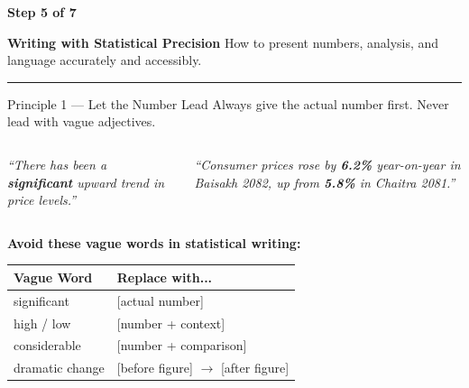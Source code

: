 \documentclass[xcolor={table,dvipsnames},aspectratio=169,11pt]{beamer}
\newcommand{\stepbadge}[1]{%
    \begin{tcolorbox}[colback=nsoGold,colframe=nsoGold,arc=8pt,auto outer arc,
        halign=center,valign=center,width=2.5cm,boxrule=0pt,top=2pt,bottom=2pt,left=2pt,right=2pt]
        \color{white}\tiny\bfseries #1
    \end{tcolorbox}%
}
\begin{document}
{
\begin{frame}[plain]
    \vspace{1.5cm}
    \stepbadge{Step 5 of 7}
    \vskip 0.4cm
    {\color{white}\LARGE\bfseries Writing with Statistical Precision}
    \vskip 0.4cm
    {\color{nsoLight}\large How to present numbers, analysis, and language accurately and accessibly.}
    \vskip 0.8cm
    \textcolor{nsoGold}{\rule{3cm}{3pt}}
\end{frame}
}

\begin{frame}{Principle 1 --- Let the Number Lead}
    Always give the actual number first. Never lead with vague adjectives.
    \vskip 0.2cm
    \begin{columns}[t]
    \begin{column}{0.48\textwidth}
        \begin{badbox}
        \footnotesize\textit{``There has been a \textbf{significant} upward trend in price levels.''}
        \end{badbox}
    \end{column}
    \begin{column}{0.48\textwidth}
        \begin{goodbox}
        \footnotesize\textit{``Consumer prices rose by \textbf{6.2\%} year-on-year in Baisakh 2082, up from \textbf{5.8\%} in Chaitra 2081.''}
        \end{goodbox}
    \end{column}
    \end{columns}
    \vskip 0.2cm
    \textbf{Avoid these vague words in statistical writing:}
    \vskip 0.1cm
    \footnotesize
    \begin{tabular}{ll}
    \toprule
    \rowcolor{nsoBlue}\color{white}\bfseries Vague Word & \color{white}\bfseries Replace with... \\
    \midrule
    significant & [actual number] \\
    high / low & [number + context] \\
    considerable & [number + comparison] \\
    dramatic change & [before figure] $\rightarrow$ [after figure] \\
    \bottomrule
    \end{tabular}
\end{frame}
\end{document}
